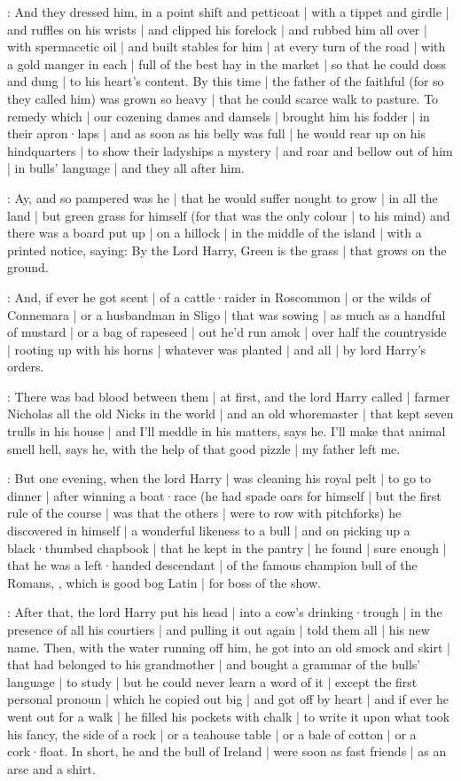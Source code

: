 \madden:
And they dressed him,
in a point shift and petticoat |
with a tippet and girdle |
and ruffles on his wrists |
and clipped his forelock |
and rubbed him all over |
with spermacetic oil |
and built stables for him |
at every turn of the road |
with a gold manger in each |
full of the best hay in the market |
so that he could doss and dung |
to his heart's content.
By this time |
the father of the faithful
(for so they called him)
was grown so heavy |
that he could scarce walk to pasture.
To remedy which |
our cozening dames and damsels |
brought him his fodder |
in their apron·laps |
and as soon as his belly was full |
he would rear up on his hindquarters |
to show their ladyships a mystery |
and roar and bellow out of him |
in bulls' language |
and they all after him.

\lenehan:
Ay,
and so pampered was he |
that he would suffer nought to grow |
in all the land |
but green grass for himself
(for that was the only colour |
to his mind)
and there was a board put up |
on a hillock |
in the middle of the island |
with a printed notice,
saying:
By the Lord Harry,
Green is the grass |
that grows on the ground.

\dixon:
And,
if ever he got scent |
of a cattle·raider in Roscommon |
or the wilds of Connemara |
or a husbandman in Sligo |
that was sowing |
as much as a handful of mustard |
or a bag of rapeseed |
out he'd run amok |
over half the countryside |
rooting up with his horns |
whatever was planted |
and all |
by lord Harry's orders.

\lynch:
There was bad blood between them |
at first,
and the lord Harry called |
farmer Nicholas all the old Nicks in the world |
and an old whoremaster |
that kept seven trulls in his house |
and I'll meddle in his matters,
says he.
I'll make that animal smell hell,
says he,
with the help of that good pizzle |
my father left me.

\dixon:
But one evening,
when the lord Harry |
was cleaning his royal pelt |
to go to dinner |
after winning a boat·race
(he had spade oars for himself |
but the first rule of the course |
was that the others |
were to row with pitchforks)
he discovered in himself |
a wonderful likeness to a bull |
and on picking up a black·thumbed chapbook |
that he kept in the pantry |
he found |
sure enough |
that he was a left·handed descendant |
of the famous champion bull of the Romans,
,
which is good bog Latin |
for boss of the show.

\lynch:
After that,
the lord Harry put his head |
into a cow's drinking·trough |
in the presence of all his courtiers |
and pulling it out again |
told them all |
his new name.
Then,
with the water running off him,
he got into an old smock and skirt |
that had belonged to his grandmother |
and bought a grammar of the bulls' language |
to study |
but he could never learn a word of it |
except the first personal pronoun |
which he copied out big |
and got off by heart |
and if ever he went out for a walk |
he filled his pockets with chalk |
to write it upon what took his fancy,
the side of a rock |
or a teahouse table |
or a bale of cotton |
or a cork·float.
In short,
he and the bull of Ireland |
were soon as fast friends |
as an arse and a shirt.

